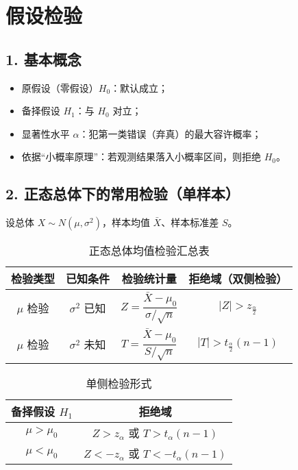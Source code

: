 \section{假设检验}

\subsection*{1. 基本概念}

\begin{itemize}
      \item 原假设（零假设）$H_0$：默认成立；
      \item 备择假设 $H_1$：与 $H_0$ 对立；
      \item 显著性水平 $\alpha$：犯第一类错误（弃真）的最大容许概率；
      \item 依据“小概率原理”：若观测结果落入小概率区间，则拒绝 $H_0$。
\end{itemize}

\subsection*{2. 正态总体下的常用检验（单样本）}

设总体 $X\sim N(\mu,\sigma^2)$，样本均值 $\bar{X}$、样本标准差 $S$。

\begin{table}[H]
      \centering
      \caption{正态总体均值检验汇总表}
      \renewcommand{\arraystretch}{1.3} %
      \begin{tabular}{|c|c|c|c|}
            \hline
            \textbf{检验类型} & \textbf{已知条件} & \textbf{检验统计量}                             & \textbf{拒绝域（双侧检验）}              \\ \hline
            $\mu$ 检验      & $\sigma^2$ 已知 & $Z=\dfrac{\bar{X}-\mu_0}{\sigma/\sqrt{n}}$ & $|Z|>z_{\frac{\alpha}{2}}$      \\ \hline
            $\mu$ 检验      & $\sigma^2$ 未知 & $T=\dfrac{\bar{X}-\mu_0}{S/\sqrt{n}}$      & $|T|>t_{\frac{\alpha}{2}}(n-1)$ \\ \hline
      \end{tabular}
\end{table}

\begin{table}[H]
      \centering
      \caption{单侧检验形式}
      \renewcommand{\arraystretch}{1.3}
      \begin{tabular}{|c|c|}
            \hline
            \textbf{备择假设 $H_1$} & \textbf{拒绝域}                       \\ \hline
            $\mu>\mu_0$         & $Z>z_\alpha$ 或 $T>t_\alpha(n-1)$   \\ \hline
            $\mu<\mu_0$         & $Z<-z_\alpha$ 或 $T<-t_\alpha(n-1)$ \\ \hline
      \end{tabular}
\end{table}

